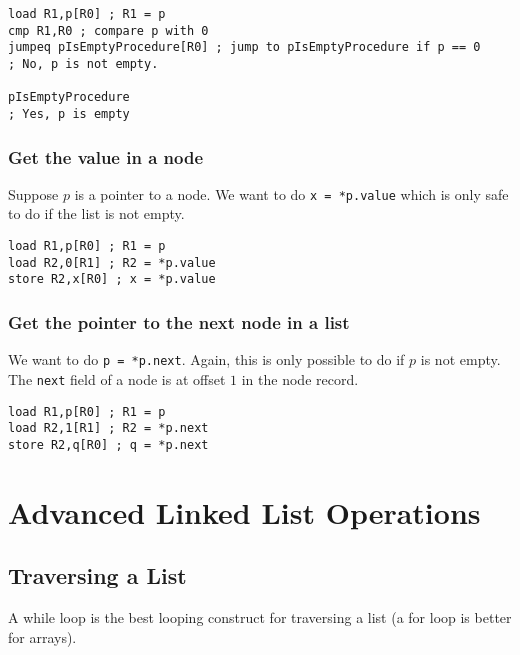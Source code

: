 \begin{verbatim}
load R1,p[R0] ; R1 = p
cmp R1,R0 ; compare p with 0
jumpeq pIsEmptyProcedure[R0] ; jump to pIsEmptyProcedure if p == 0
; No, p is not empty.

pIsEmptyProcedure
; Yes, p is empty
\end{verbatim}

\subsubsection{Get the value in a node}\label{ssub:get_the_value_in_a_node}

Suppose \(p\) is a pointer to a node.
We want to do \texttt{x = *p.value} which is only safe to do if the list is not empty.

\begin{verbatim}
load R1,p[R0] ; R1 = p
load R2,0[R1] ; R2 = *p.value
store R2,x[R0] ; x = *p.value
\end{verbatim}

\subsubsection{Get the pointer to the next node in a list}\label{ssub:get_the_pointer_to_the_next_node_in_a_list}

We want to do \texttt{p = *p.next}.
Again, this is only possible to do if \(p\) is not empty.
The \texttt{next} field of a node is at offset \(1\) in the node record.

\begin{verbatim}
load R1,p[R0] ; R1 = p
load R2,1[R1] ; R2 = *p.next
store R2,q[R0] ; q = *p.next
\end{verbatim}

\section{Advanced Linked List Operations}\label{sec:advanced_linked_list_operations}

\subsection{Traversing a List}\label{sub:traversing_a_list}

A while loop is the best looping construct for traversing a list (a for loop is better for arrays).

